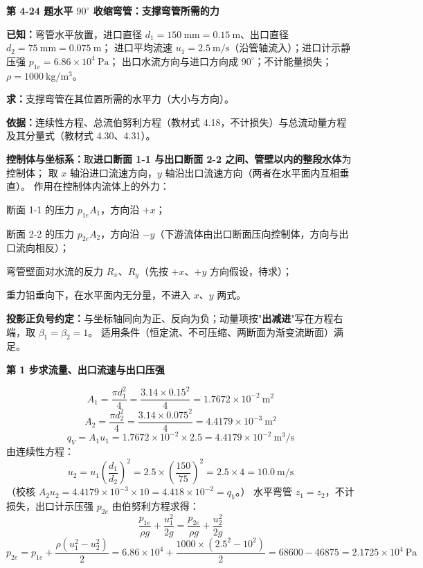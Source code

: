 \noindent\textbf{第 4-24 题\quad 水平 $90^\circ$ 收缩弯管：支撑弯管所需的力}

\begin{jie}
\textbf{已知：}弯管水平放置，进口直径 $d_1=150\ \mathrm{mm}=0.15\ \mathrm{m}$、出口直径 $d_2=75\ \mathrm{mm}=0.075\ \mathrm{m}$；
进口平均流速 $u_1=2.5\ \mathrm{m/s}$（沿管轴流入）；进口计示静压强 $p_{1e}=6.86\times10^4\ \mathrm{Pa}$；
出口水流方向与进口方向成 $90^\circ$；不计能量损失；$\rho=1000\ \mathrm{kg/m^3}$。

\textbf{求：}支撑弯管在其位置所需的水平力（大小与方向）。

\textbf{依据：}连续性方程、总流伯努利方程（教材式 4.18，不计损失）与总流动量方程及其分量式（教材式 4.30、4.31）。

\textbf{控制体与坐标系：}取\textbf{进口断面 1-1 与出口断面 2-2 之间、管壁以内的整段水体}为控制体；
取 $x$ 轴沿进口流速方向，$y$ 轴沿出口流速方向（两者在水平面内互相垂直）。
作用在控制体内流体上的外力：
\begin{xiaowen}
\item 断面 1-1 的压力 $p_{1e}A_1$，方向沿 $+x$；
\item 断面 2-2 的压力 $p_{2e}A_2$，方向沿 $-y$（下游流体由出口断面压向控制体，方向与出口流向相反）；
\item 弯管壁面对水流的反力 $R_x$、$R_y$（先按 $+x$、$+y$ 方向假设，待求）；
\item 重力铅垂向下，在水平面内无分量，不进入 $x$、$y$ 两式。
\end{xiaowen}
\textbf{投影正负号约定：}与坐标轴同向为正、反向为负；动量项按"\textbf{出减进}"写在方程右端，取 $\beta_1=\beta_2=1$。
适用条件（恒定流、不可压缩、两断面为渐变流断面）满足。

\textbf{第 1 步\quad 求流量、出口流速与出口压强}

\[ A_1=\frac{\pi d_1^2}{4}=\frac{3.14\times0.15^2}{4}=1.7672\times10^{-2}\ \mathrm{m^2} \]
\[ A_2=\frac{\pi d_2^2}{4}=\frac{3.14\times0.075^2}{4}=4.4179\times10^{-3}\ \mathrm{m^2} \]
\[ q_V=A_1u_1=1.7672\times10^{-2}\times2.5=4.4179\times10^{-2}\ \mathrm{m^3/s} \]
由连续性方程：
\[ u_2=u_1\left(\frac{d_1}{d_2}\right)^2=2.5\times\left(\frac{150}{75}\right)^2=2.5\times4=10.0\ \mathrm{m/s} \]
（校核 $A_2u_2=4.4179\times10^{-3}\times10=4.418\times10^{-2}=q_V$。）
水平弯管 $z_1=z_2$，不计损失，出口计示压强 $p_{2e}$ 由伯努利方程求得：
\[ \frac{p_{1e}}{\rho g}+\frac{u_1^2}{2g}=\frac{p_{2e}}{\rho g}+\frac{u_2^2}{2g} \]
\[ p_{2e}=p_{1e}+\frac{\rho\left(u_1^2-u_2^2\right)}{2}
   =6.86\times10^4+\frac{1000\times\left(2.5^2-10^2\right)}{2}=68600-46875=2.1725\times10^4\ \mathrm{Pa} \]


\end{jie}
